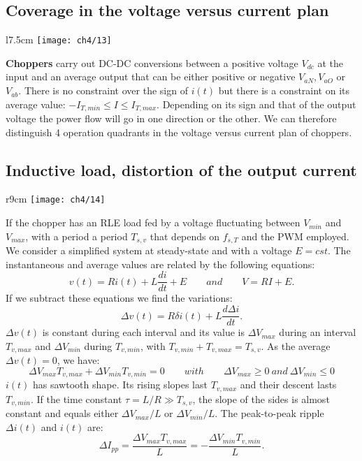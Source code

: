	\subsection{Coverage in the voltage versus current plan}
		\begin{wrapfigure}[10]{l}{7.5cm}
		\vspace{-5mm}
		\texttt{[image: ch4/13]}
		\end{wrapfigure}
		\textbf{Choppers} carry out DC-DC conversions between a positive voltage $V_{dc}$ at the input and an average output that can be either positive or negative $V_{aN}, V_{aO}$ or $V_{ab}$. There is no constraint over the sign of $i(t)$ but there is a constraint on its average value: $-I_{T,min}\leq I \leq I_{T,max}$. Depending on its sign and that of the output voltage the power flow will go in one direction or the other. We can therefore distinguish 4 operation quadrants in the voltage versus current plan of choppers. 
		
	\subsection{Inductive load, distortion of the output current}
		\begin{wrapfigure}[8]{r}{9cm}
		\vspace{-5mm}
		\texttt{[image: ch4/14]}
		\end{wrapfigure}
		If the chopper has an RLE load fed by a voltage fluctuating between $V_{min}$ and $V_{max}$, with a period a period $T_{s,v}$ that depends on $f_{s,T}$ and the PWM employed. We consider a simplified system at steady-state and with a voltage $E=cst$. The instantaneous and average values are related by the following equations:\\
		\begin{equation}
			v(t) = Ri(t) + L\frac{di}{dt} + E \qquad and \qquad V = RI + E.
		\end{equation}
		If we subtract these equations we find the variations:
		\begin{equation}
			\Delta v(t) = R\delta i(t) + L\frac{d\Delta i}{dt}.
		\end{equation}
		$\Delta v(t)$ is constant during each interval and its value is $\Delta V_{max}$ during an interval $T_{v,max}$ and $\Delta V_{min}$ during $T_{v,min}$, with $T_{v,min} + T_{v,max} = T_{s,v}$. As the average $\Delta v(t) = 0$, we have:
		\begin{equation}
			\Delta V_{max}T_{v,max} + \Delta V_{min}T_{v,min} = 0 \qquad with \qquad \Delta V_{max} \geq 0 \ and \ \Delta V_{min} \leq 0
		\end{equation}
		$i(t)$ has sawtooth shape. Its rising slopes last $T_{v,max}$ and their descent lasts $T_{v,min}$. If the time constant $\tau = L/R \gg T_{s,v}$, the slope of the sides is almost constant and equals either $\Delta V_{max}/L$ or $\Delta V_{min}/L$. The peak-to-peak ripple $\Delta i(t)$ and $i(t)$ are:
		\begin{equation}
			\Delta I_{pp} = \frac{\Delta V_{max}T_{v,max}}{L} = -\frac{\Delta V_{min}T_{v,min}}{L}.
		\end{equation}
		
